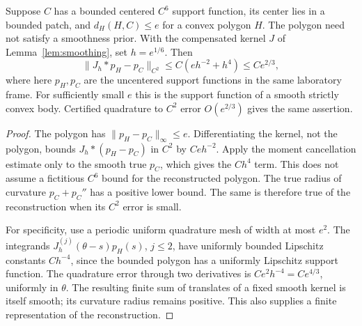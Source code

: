 \begin{proposition}\label{prop:hull-smooth}
Suppose $C$ has a bounded centered $C^6$ support function, its center
lies in a bounded patch, and $d_H(H,C)\le e$ for a convex polygon $H$.
The polygon need not satisfy a smoothness prior. With the compensated
kernel $J$ of Lemma~\ref{lem:smoothing}, set $h=e^{1/6}$. Then
\begin{equation}\label{eq:polygon-smoothing}
 \|J_h*p_H-p_C\|_{C^2}\le C(eh^{-2}+h^4)\le Ce^{2/3},
\end{equation}
where here $p_H,p_C$ are the uncentered support functions in the same
laboratory frame. For sufficiently small $e$ this is the support
function of a smooth strictly convex body. Certified quadrature to
$C^2$ error $O(e^{2/3})$ gives the same assertion.
\end{proposition}
\begin{proof}
The polygon has $\|p_H-p_C\|_\infty\le e$. Differentiating the kernel,
not the polygon, bounds $J_h*(p_H-p_C)$ in $C^2$ by $Ceh^{-2}$.
Apply the moment cancellation estimate only to the smooth true $p_C$,
which gives the $Ch^4$ term. This does not assume a fictitious $C^6$
bound for the reconstructed polygon. The true radius of curvature
$p_C+p_C''$ has a positive lower bound. The same is therefore true
of the reconstruction when its $C^2$ error is small.

For specificity, use a periodic uniform quadrature mesh of width at
most $e^2$. The integrands $J_h^{(j)}(\theta-s)p_H(s)$, $j\le2$,
have uniformly bounded Lipschitz constants $Ch^{-4}$, since the bounded
polygon has a uniformly Lipschitz support function. The quadrature
error through two derivatives is $Ce^2h^{-4}=Ce^{4/3}$, uniformly in
$\theta$. The resulting finite sum of translates of a fixed smooth
kernel is itself smooth; its curvature radius remains positive. This
also supplies a finite representation of the reconstruction.
\end{proof}

